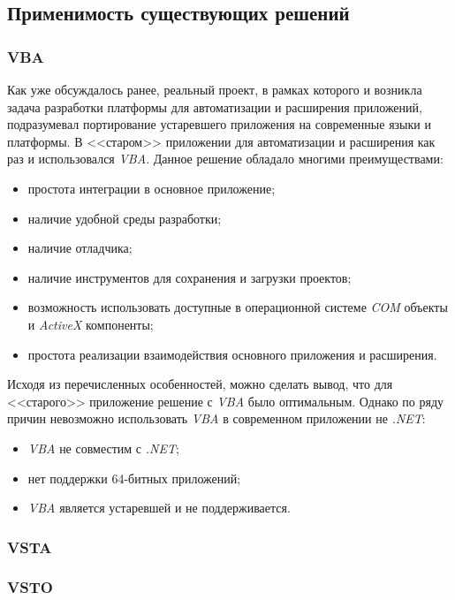 \subsection{Применимость существующих решений}


\subsubsection{VBA}

Как уже обсуждалось ранее, реальный проект, в рамках которого и возникла задача разработки платформы для автоматизации и расширения приложений, подразумевал портирование устаревшего приложения на современные языки и платформы. В <<старом>> приложении для автоматизации и расширения как раз и использовался {\it VBA}. Данное решение обладало многими преимуществами:
\begin{itemize}
\item простота интеграции в основное приложение;
\item наличие удобной среды разработки;
\item наличие отладчика;
\item наличие инструментов для сохранения и загрузки проектов;
\item возможность использовать доступные в операционной системе {\it COM}  объекты и {\it ActiveX} компоненты;
\item простота реализации взаимодействия основного приложения и расширения.
\end{itemize}

Исходя из перечисленных особенностей, можно сделать вывод, что для <<старого>> приложение решение с {\it VBA} было оптимальным. Однако по ряду причин невозможно использовать {\it VBA} в современном приложении не {\it .NET}:

\begin{itemize}
   \item {\it VBA} не совместим с {\it .NET};
   \item нет поддержки 64-битных приложений;
   \item {\it VBA} является устаревшей и не поддерживается.
\end{itemize}


\subsubsection{VSTA}


\subsubsection{VSTO}
